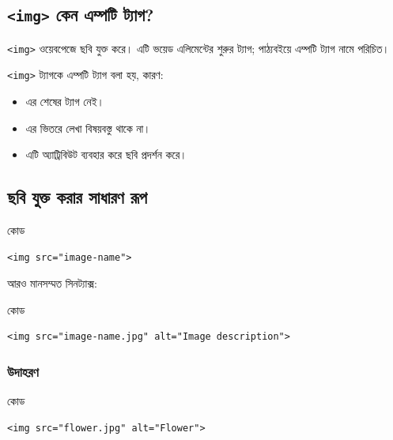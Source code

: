 \subsection{\texttt{<img>} কেন এম্পটি ট্যাগ?}

\texttt{<img>} ওয়েবপেজে ছবি যুক্ত করে। এটি ভয়েড এলিমেন্টের শুরুর ট্যাগ; পাঠ্যবইয়ে এম্পটি ট্যাগ নামে পরিচিত।

\texttt{<img>} ট্যাগকে এম্পটি ট্যাগ বলা হয়, কারণ:

\begin{itemize}
\item এর শেষের ট্যাগ নেই।
\item এর ভিতরে লেখা বিষয়বস্তু থাকে না।
\item এটি অ্যাট্রিবিউট ব্যবহার করে ছবি প্রদর্শন করে।
\end{itemize}



\subsection{ছবি যুক্ত করার সাধারণ রূপ}

\begin{examplebox}{কোড}
\par\noindent\begin{minipage}{\linewidth}
\begin{verbatim}
<img src="image-name">
\end{verbatim}
\end{minipage}\par
\end{examplebox}

আরও মানসম্মত সিনট্যাক্স:

\begin{examplebox}{কোড}
\par\noindent\begin{minipage}{\linewidth}
\begin{verbatim}
<img src="image-name.jpg" alt="Image description">
\end{verbatim}
\end{minipage}\par
\end{examplebox}

\subsubsection{উদাহরণ}

\begin{examplebox}{কোড}
\par\noindent\begin{minipage}{\linewidth}
\begin{verbatim}
<img src="flower.jpg" alt="Flower">
\end{verbatim}
\end{minipage}\par
\end{examplebox}

